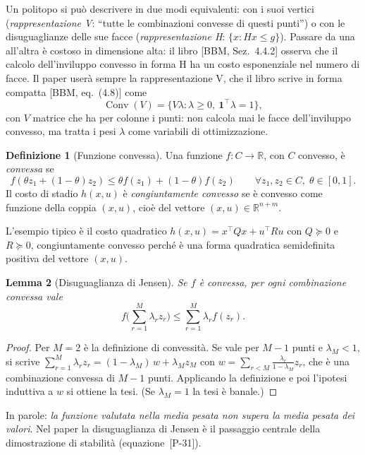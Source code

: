 \documentclass[11pt,a4paper]{article}
\theoremstyle{definition}
\newtheorem{definizione}{Definizione}[section]
\theoremstyle{plain}
\newtheorem{lemma}[definizione]{Lemma}
\theoremstyle{remark}
\newcommand{\R}{\mathbb{R}}
\DeclareMathOperator{\Conv}{Conv}
\newcommand{\eqp}[1]{\textup{[P-#1]}}   %
\newcommand{\libro}[1]{\textup{[BBM, #1]}} %
\newcommand{\vett}[1]{\mathbf{#1}}
\begin{document}
Un politopo si può descrivere in due modi equivalenti: con i suoi vertici
(\emph{rappresentazione V}: ``tutte le combinazioni convesse di questi
punti'') o con le disuguaglianze delle sue facce (\emph{rappresentazione H}:
$\{x: Hx\le g\}$). Passare da una all'altra è costoso in dimensione alta: il
libro \libro{Sez.~4.4.2} osserva che il calcolo dell'inviluppo convesso in
forma H ha un costo esponenziale nel numero di facce. Il
paper userà sempre la rappresentazione V, che il libro scrive in forma
compatta \libro{eq.~(4.8)} come
\[
  \Conv(V) = \{V\lambda : \lambda\ge 0,\ \vett{1}^\top\lambda = 1\},
\]
con $V$ matrice che ha per colonne i punti: non calcola mai le facce
dell'inviluppo convesso, ma tratta i pesi $\lambda$ come variabili di
ottimizzazione.

\begin{definizione}[Funzione convessa]
Una funzione $f:C\to\R$, con $C$ convesso, è \emph{convessa} se
\[
  f(\theta z_1 + (1-\theta) z_2) \le \theta f(z_1) + (1-\theta) f(z_2)
  \qquad \forall z_1,z_2\in C,\;\theta\in[0,1].
\]
Il costo di stadio $h(x,u)$ è \emph{congiuntamente convesso} se è convesso
come funzione della coppia $(x,u)$, cioè del vettore $(x,u)\in\R^{n+m}$.
\end{definizione}

L'esempio tipico è il costo quadratico $h(x,u)=x^\top Q x + u^\top R u$ con
$Q\succeq 0$ e $R\succeq 0$, congiuntamente convesso perché è una forma
quadratica semidefinita positiva del vettore $(x,u)$.

\begin{lemma}[Disuguaglianza di Jensen]\label{lem:jensen}
Se $f$ è convessa, per ogni combinazione convessa vale
\[
  f\Big(\sum_{r=1}^M \lambda_r z_r\Big) \le \sum_{r=1}^M \lambda_r f(z_r).
\]
\end{lemma}
\begin{proof}
Per $M=2$ è la definizione di convessità. Se vale per $M-1$ punti e
$\lambda_M<1$, si scrive
$\sum_{r=1}^{M}\lambda_r z_r = (1-\lambda_M)\,w + \lambda_M z_M$ con
$w=\sum_{r<M}\frac{\lambda_r}{1-\lambda_M}z_r$, che è una combinazione
convessa di $M-1$ punti. Applicando la definizione e poi l'ipotesi induttiva
a $w$ si ottiene la tesi. (Se $\lambda_M=1$ la tesi è banale.)
\end{proof}

In parole: \emph{la funzione valutata nella media pesata non supera la media
pesata dei valori}. Nel paper la disuguaglianza di Jensen è il passaggio
centrale della dimostrazione di stabilità (equazione~\eqp{31}).
\end{document}
